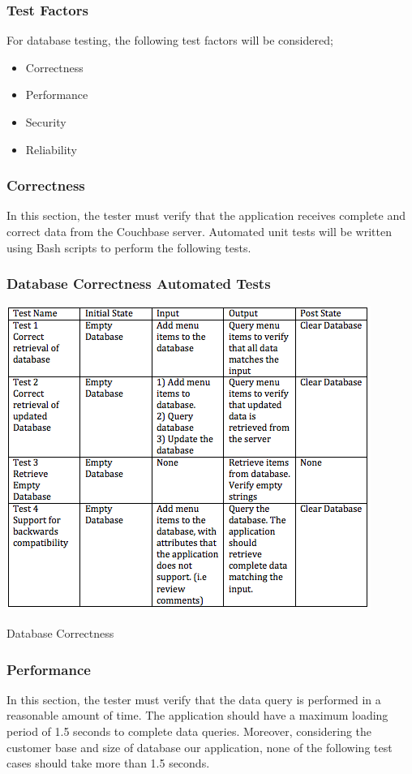 \documentclass[12pt]{article}
\begin{document}
\subsubsection{Test Factors}
For database testing, the following test factors will be considered;
\begin{itemize}
 \item Correctness
 \item Performance
 \item Security
 \item Reliability
 \end{itemize}
 
\subsubsection{Correctness}
In this section, the tester must verify that the application receives complete and correct data from the Couchbase server. Automated unit tests will be written using Bash scripts to perform the following tests.
\subsubsection{Database Correctness Automated Tests }
\begin{table}[h]
\includegraphics[width=\textwidth,height=\textheight,keepaspectratio]{correctness_tests.png}
  \caption{Database Correctness}
  \label{tbl:excel-table}
\end{table}
\subsubsection{Performance}
In this section, the tester must verify that the data query is performed in a reasonable amount of time. The application should have a maximum loading period of 1.5 seconds to complete data queries. Moreover, considering the customer base and size of database our application, none of the following test cases should take more than 1.5 seconds.
\end{document}
